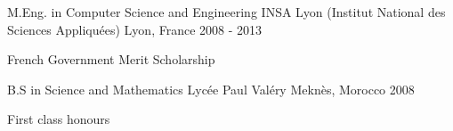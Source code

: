 


\begin{cventries}


\cventry
{M.Eng. in Computer Science and Engineering} %
{INSA Lyon (Institut National des Sciences Appliquées)} %
{Lyon, France} %
{2008 - 2013} %
{ %
\begin{cvitems}
 \setlength\itemsep{1em}
\item {\scriptsize French Government Merit Scholarship}
\end{cvitems}
}

\cventry
{\scriptsize B.S in Science and Mathematics} %
{\scriptsize Lycée Paul Valéry} %
{\scriptsize Meknès, Morocco} %
{\scriptsize 2008} %
{ %
\begin{cvitems}
 \setlength\itemsep{1em}
\item {\scriptsize First class honours}
\end{cvitems}
}


\end{cventries}
